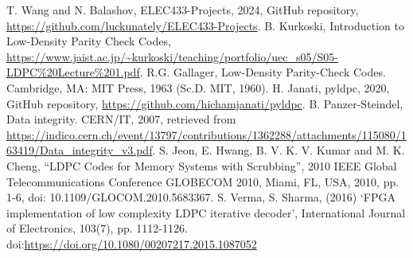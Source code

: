 \documentclass[conference]{IEEEtran}
\begin{document}
\begin{thebibliography}{00}
   T. Wang and N. Balashov, ELEC433-Projects, 2024, GitHub repository, \url{https://github.com/luckunately/ELEC433-Projects}.
   B. Kurkoski, Introduction to Low-Density Parity Check Codes, \url{https://www.jaist.ac.jp/~kurkoski/teaching/portfolio/uec_s05/S05-LDPC%20Lecture%201.pdf}.
   R.G. Gallager, Low-Density Parity-Check Codes. Cambridge, MA: MIT Press, 1963 (Sc.D. MIT, 1960).
   H. Janati, pyldpc, 2020, GitHub repository, \url{https://github.com/hichamjanati/pyldpc}.
   B. Panzer-Steindel, Data integrity. CERN/IT, 2007, retrieved from \url{https://indico.cern.ch/event/13797/contributions/1362288/attachments/115080/163419/Data_integrity_v3.pdf}.
  S. Jeon, E. Hwang, B. V. K. V. Kumar and M. K. Cheng, ``LDPC Codes for Memory Systems with Scrubbing'', 2010 IEEE Global Telecommunications Conference GLOBECOM 2010, Miami, FL, USA, 2010, pp. 1-6, doi: 10.1109/GLOCOM.2010.5683367.
   S. Verma, S. Sharma, (2016) `FPGA implementation of low complexity LDPC iterative decoder', International Journal of Electronics, 103(7), pp. 1112-1126. doi:\url{https://doi.org/10.1080/00207217.2015.1087052}
\end{thebibliography}
\end{document}
